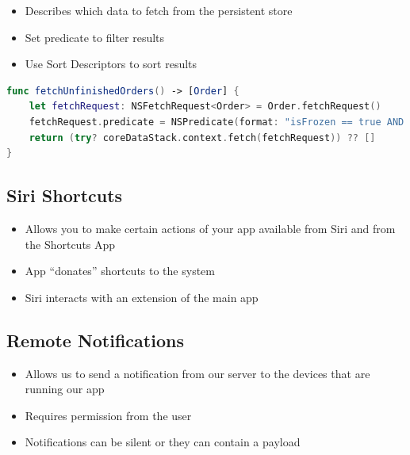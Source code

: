 \begin{breakbox}

\begin{itemize}
\tightlist
\item
  Describes which data to fetch from the persistent store
\item
  Set predicate to filter results
\item
  Use Sort Descriptors to sort results
\end{itemize}

\begin{lstlisting}[language=swift]
func fetchUnfinishedOrders() -> [Order] {
    let fetchRequest: NSFetchRequest<Order> = Order.fetchRequest()
    fetchRequest.predicate = NSPredicate(format: "isFrozen == true AND isReady == false")
    return (try? coreDataStack.context.fetch(fetchRequest)) ?? []
}
\end{lstlisting}
\end{breakbox}

\subsection{Siri Shortcuts}
\begin{breakbox}

\begin{itemize}
\tightlist
\item
  Allows you to make certain actions of your app available from Siri and
  from the Shortcuts App
\item
  App ``donates'' shortcuts to the system
\item
  Siri interacts with an extension of the main app
\end{itemize}
\end{breakbox}

\subsection{Remote Notifications}
\begin{breakbox}
\begin{itemize}
\tightlist
\item
  Allows us to send a notification from our server to the devices that
  are running our app
\item
  Requires permission from the user
\item
  Notifications can be silent or they can contain a payload
\end{itemize}
\end{breakbox}

